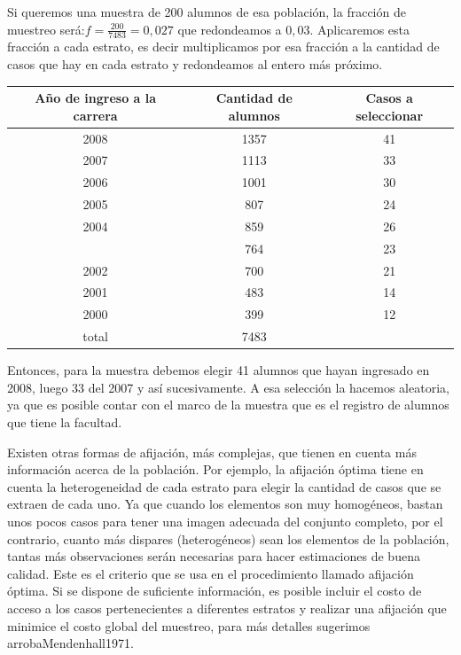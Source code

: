 \documentclass[]{article}
\begin{document}
Si queremos una muestra de 200 alumnos de esa población, la fracción de
muestreo será:\(f = \frac{200}{7483} = 0,027\) que redondeamos a \(0,03\).
Aplicaremos esta fracción a cada estrato, es decir multiplicamos por esa
fracción a la cantidad de casos que hay en cada estrato y redondeamos al
entero más próximo.

\begin{table}[H]
\centering
\begin{tabular}{ccc}
\toprule
Año de ingreso a la carrera & Cantidad de alumnos & Casos a seleccionar\\
\midrule
\rowcolor{gray!6}  2008 & 1357 & 41\\
2007 & 1113 & 33\\
\rowcolor{gray!6}  2006 & 1001 & 30\\
2005 & 807 & 24\\
\rowcolor{gray!6}  2004 & 859 & 26\\
\addlinespace
2003 & 764 & 23\\
\rowcolor{gray!6}  2002 & 700 & 21\\
2001 & 483 & 14\\
\rowcolor{gray!6}  2000 & 399 & 12\\
total & 7483 & \\
\bottomrule
\end{tabular}
\end{table}

Entonces, para la muestra debemos elegir 41 alumnos que hayan ingresado
en 2008, luego 33 del 2007 y así sucesivamente. A esa selección la
hacemos aleatoria, ya que es posible contar con el marco de la muestra
que es el registro de alumnos que tiene la facultad.

Existen otras formas de afijación, más complejas, que tienen en cuenta
más información acerca de la población. Por ejemplo, la afijación óptima
tiene en cuenta la heterogeneidad de cada estrato para elegir la
cantidad de casos que se extraen de cada uno. Ya que cuando los
elementos son muy homogéneos, bastan unos pocos casos para tener una
imagen adecuada del conjunto completo, por el contrario, cuanto más
dispares (heterogéneos) sean los elementos de la población, tantas más
observaciones serán necesarias para hacer estimaciones de buena calidad.
Este es el criterio que se usa en el procedimiento llamado afijación
óptima. Si se dispone de suficiente información, es posible incluir el
costo de acceso a los casos pertenecientes a diferentes estratos y
realizar una afijación que minimice el costo global del muestreo, para
más detalles sugerimos arrobaMendenhall1971.
\end{document}

